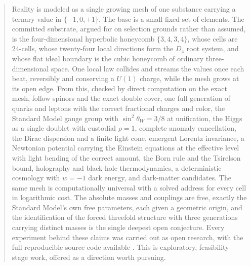 \begin{abstract}
Reality is modeled as a single growing mesh of one substance carrying a ternary value in $\{-1, 0, +1\}$. The base
is a small fixed set of elements. The committed substrate, argued for on selection grounds rather
than assumed, is the four-dimensional hyperbolic honeycomb $\{3,4,3,4\}$, whose cells are 24-cells, whose twenty-four
local directions form the $D_4$ root system, and whose flat ideal boundary is the cubic honeycomb of ordinary
three-dimensional space. One local law collides and streams the values once each beat, reversibly and conserving a
$U(1)$ charge, while the mesh grows at its open edge. From this, checked by direct computation on the exact mesh,
follow spinors and the exact double cover, one full generation of quarks and leptons with the correct fractional
charges and color, the Standard Model gauge group with $\sin^2\theta_W = 3/8$ at unification, the Higgs as a single
doublet with custodial $\rho = 1$, complete anomaly cancellation, the Dirac dispersion and a finite light cone,
emergent Lorentz invariance, a Newtonian potential carrying the Einstein equations at the effective level with light
bending of the correct amount, the Born rule and the Tsirelson bound, holography and black-hole thermodynamics, a
deterministic cosmology with $w = -1$ dark energy, and dark-matter candidates. The same mesh is computationally
universal with a solved address for every cell in logarithmic cost. The absolute masses and couplings are free,
exactly the Standard Model's own free parameters, each given a geometric origin, and the identification of the forced
threefold structure with three generations carrying distinct masses is the single deepest open conjecture. Every
experiment behind these claims was carried out as open research, with the full reproducible source code available
\cite{cluesurf2026repo}. This is exploratory, feasibility-stage work, offered as a direction worth pursuing.
\end{abstract}

